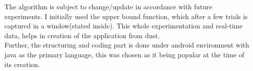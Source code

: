 \begin{SingleSpace}
The algorithm is subject to change/update in accordance with future experiments. I initially used the upper bound function, which after a few trials is captured in a window(stated inside). This whole experimentation and real-time data, helps in creation of the application from dust. \\

Further, the structuring and coding part is done under android environment with java as the primary language, this was chosen as it being popular at the time of its creation.


\end{SingleSpace}
\clearpage